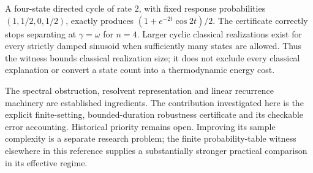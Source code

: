 A four-state directed cycle of rate $2$, with fixed response probabilities
$(1,1/2,0,1/2)$, exactly produces
$(1+e^{-2t}\cos2t)/2$. The certificate correctly stops separating at
$\gamma=\omega$ for $n=4$. Larger cyclic classical realizations exist for every
strictly damped sinusoid when sufficiently many states are allowed. Thus the
witness bounds classical realization size; it does not exclude every classical
explanation or convert a state count into a thermodynamic energy cost.

The spectral obstruction, resolvent representation and linear recurrence
machinery are established ingredients. The contribution investigated here is
the explicit finite-setting, bounded-duration robustness certificate and its
checkable error accounting. Historical priority remains open. Improving its
sample complexity is a separate research problem; the finite probability-table
witness elsewhere in this reference supplies a substantially stronger practical
comparison in its effective regime.
